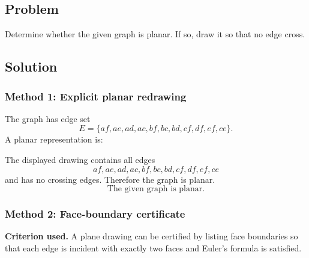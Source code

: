 \documentclass[12pt]{article}
\begin{document}
\subsection{Problem}
Determine whether the given graph is planar. If so, draw it so that no edge cross.

\begin{center}
\end{center}

\subsection{Solution}

\subsubsection{Method 1: Explicit planar redrawing}
The graph has edge set
\[
E=\{af,ae,ad,ac,bf,bc,bd,cf,df,ef,ce\}.
\]
A planar representation is:

\begin{center}
\end{center}

The displayed drawing contains all edges
\[
 af,ae,ad,ac,bf,bc,bd,cf,df,ef,ce
\]
and has no crossing edges. Therefore the graph is planar.
\[
\boxed{\text{The given graph is planar.}}
\]

\subsubsection{Method 2: Face-boundary certificate}
\textbf{Criterion used.} A plane drawing can be certified by listing face boundaries so that each edge is incident with exactly two faces and Euler's formula is satisfied.
\end{document}
